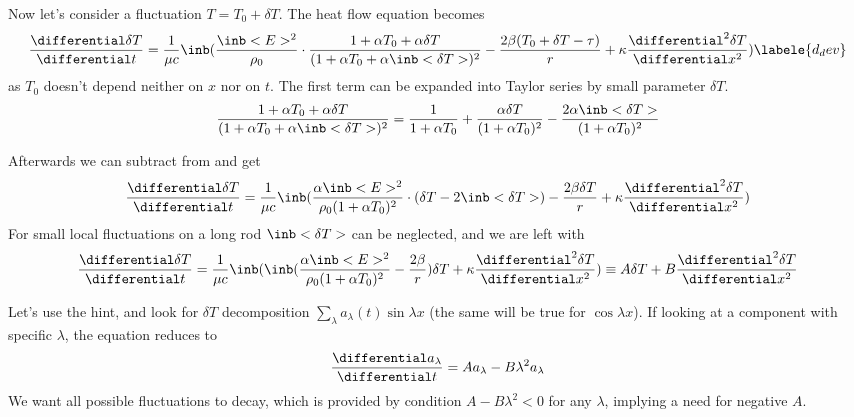 Now let's consider a fluctuation $T=T_0+\delta T$.
The heat flow equation becomes
\begin{equation}
    \frac{\differential \delta T}{\differential t} = \frac{1}{\mu c}
    \inb({
        \frac{\inb<E>^2}{\rho_0} \cdot
        \frac{1+\alpha T_0+\alpha\delta T}
        {(1+\alpha T_0+\alpha \inb<{\delta T}>)^2} -
        \frac{2\beta (T_0+\delta T-\tau)}{r} +
        \kappa \frac{\differential^2 \delta T}{\differential x^2}
    })
    \labele{d_dev}
\end{equation}
as $T_0$ doesn't depend neither on $x$ nor on $t$.
The first term can be expanded into Taylor series
by small parameter $\delta T$.
\begin{equation}
    \frac{1+\alpha T_0+\alpha\delta T}
        {(1+\alpha T_0+\alpha \inb<{\delta T}>)^2}=
    \frac{1}{1+\alpha T_0}+\frac{\alpha \delta T}{(1+\alpha T_0)^2}
    -\frac{2\alpha \inb<{\delta T}>}{(1+\alpha T_0)^2}
\end{equation}

Afterwards we can subtract  from  and get
\begin{equation}
    \frac{\differential \delta T}{\differential t} =\frac{1}{\mu c}
    \inb({
        \frac{\alpha \inb<E>^2}{\rho_0 (1+\alpha T_0)^2} \cdot
        (\delta T - 2\inb<{\delta T}>) -
        \frac{2\beta \delta T}{r} +
        \kappa \frac{\differential^2 \delta T}{\differential x^2}
    })
\end{equation}
For small local fluctuations on a long rod $\inb<{\delta T}>$ can be neglected,
and we are left with
\begin{equation}
    \frac{\differential \delta T}{\differential t} =\frac{1}{\mu c}
    \inb({
        \inb({\frac{\alpha \inb<E>^2}{\rho_0 (1+\alpha T_0)^2}
        -\frac{2\beta}{r}}) \delta T +
        \kappa \frac{\differential^2 \delta T}{\differential x^2}
    })\equiv A \delta T + B \frac{\differential^2 \delta T}{\differential x^2}
\end{equation}

Let's use the hint, and look for $\delta T$ decomposition
$\sum_\lambda a_\lambda(t) \sin \lambda x$
(the same will be true for $\cos \lambda x$).
If looking at a component with specific $\lambda$, the equation reduces to
\begin{equation}
    \frac{\differential a_\lambda}{\differential t} =
    A a_\lambda - B \lambda^2 a_\lambda
\end{equation}
We want all possible fluctuations to decay,
which is provided by condition $A - B \lambda^2 < 0$ for any $\lambda$,
implying a need for negative $A$.

